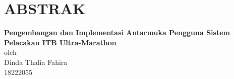 \chapter*{ABSTRAK}

\begin{center}

    \textbf{Pengembangan dan Implementasi Antarmuka Pengguna Sistem Pelacakan ITB Ultra-Marathon} \\
    \vspace{0.4cm}
    oleh \\
    \vspace{0.4cm}
    Dinda Thalia Fahira\\
    18222055\\
\end{center}


